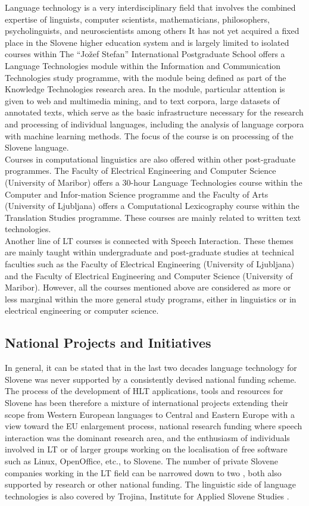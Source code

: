 \begin{multicols}{2}
Language technology is a very interdisciplinary field that involves the combined expertise of linguists, computer scientists, mathematicians, philosophers, psycholinguists, and neuroscientists among others It has not yet acquired a fixed place in the Slovene higher education system and is largely limited to isolated courses within The “Jožef Stefan” International Postgraduate School offers a Language Technologies module within the Information and Communication Technologies study programme, with the module being defined as part of the Knowledge Technologies research area. In the module, particular attention is given to web and multimedia mining, and to text corpora, large datasets of annotated texts, which serve as the basic infrastructure necessary for the research and processing of individual languages, including the analysis of language corpora with machine learning methods. The focus of the course is on processing of the Slovene language.\\
Courses in computational linguistics are also offered within other post-graduate programmes. The Faculty of Electrical Engineering and Computer Science (University of Maribor) offers a 30-hour Language Technologies course within the Computer and Infor-mation Science programme and the Faculty of Arts (University of Ljub\-ljana) offers a Computational Lexicography course within the Translation Studies programme. These courses are mainly related to written text technologies.\\
Another line of LT courses is connected with Speech Interaction. These themes are mainly taught within undergraduate and post-graduate studies at technical faculties such as the Faculty of Electrical Engineering (University of Ljub\-ljana) and the Faculty of Electrical Engineering and Computer Science (University of Maribor). However, all the courses mentioned above are considered as more or less marginal within the more general study programs, either in linguistics or in electrical engineering or computer science.


\subsection{National Projects and Initiatives}

In general, it can be stated that in the last two decades language technology for Slovene was never supported by a consistently devised national funding scheme. The process of the development of HLT applications, tools and resources for Slovene has been therefore a mixture of international projects extending their scope from Western European languages to Central and Eastern Europe with a view toward the EU enlargement process, national research funding where speech interaction was the dominant research area, and the enthusiasm of individuals involved in LT or of larger groups working on the localisation of free software such as Linux, OpenOffice, etc., to Slovene.  The number of private Slovene companies working in the LT field can be narrowed down to two \cite{Alp3} \cite{Amb6}, both also supported by research or other national funding. The linguistic side of language technologies is also covered by Trojina, Institute for Applied Slovene Studies \cite{Troj1}.


\end{multicols}

